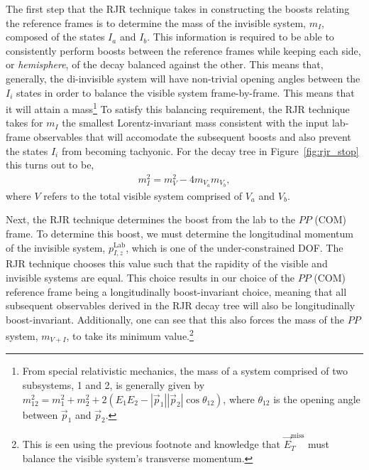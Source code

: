 The first step that the RJR technique takes in constructing the boosts relating the reference frames is to
determine the mass of the invisible system, $m_I$, composed of the states $I_a$ and $I_b$.
This information is required to be able to consistently perform boosts between the reference frames while
keeping each side, or \textit{hemisphere}, of the decay balanced against the other.
This means that, generally, the di-invisible system will have non-trivial opening angles between the $I_i$
states in order to balance the visible system frame-by-frame.
This means that it will attain a mass\footnote{From special relativistic mechanics, the mass of a system comprised
of two subsystems, 1 and 2, is generally given by $m_{12}^2 = m_1^2 + m_2^2 + 2(E_1E_2 - |\vec{p}_1| |\vec{p}_2| \cos \theta_{12})$,
where $\theta_{12}$ is the opening angle between $\vec{p}_1$ and $\vec{p}_2$.}
To satisfy this balancing requirement, the RJR technique takes for $m_I$ the smallest Lorentz-invariant
mass consistent with the input lab-frame observables that will accomodate the subsequent boosts and also prevent
the states $I_i$ from becoming tachyonic.
For the decay tree in Figure~\ref{fig:rjr_stop} this turns out to be,
\begin{align}
    m_I^2 = m_V^2 - 4m_{V_a} m_{V_b},
    \label{eq:rjr_invisible_mass}
\end{align}
where $V$ refers to the total visible system comprised of $V_a$ and $V_b$.

Next, the RJR technique determines the boost from the lab to the $PP$ (COM) frame.
To determine this boost, we must determine the longitudinal momentum of the invisible system, $p_{I,z}^{\text{Lab}}$,
which is one of the under-constrained DOF.
The RJR technique chooses this value such that the rapidity of the visible and invisible systems are equal.
This choice results in our choice of the $PP$ (COM) reference frame being a longitudinally boost-invariant
choice, meaning that all subsequent observables derived in the RJR decay tree will also be
longitudinally boost-invariant.
Additionally, one can see that this also forces the mass of the $PP$ system, $m_{V+I}$, to
take its minimum value.\footnote{This is een using the previous footnote and knowledge that $\vec{E}_T^{\text{miss}}$
must balance the visible system's transverse momentum.}

